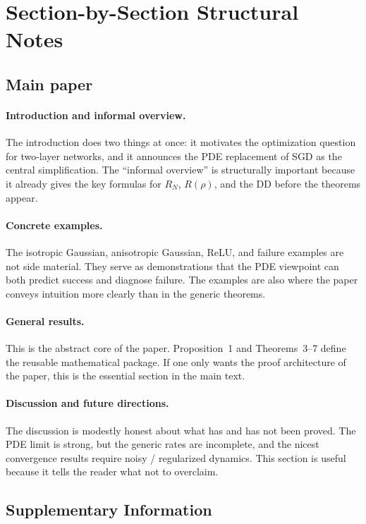 \section{Section-by-Section Structural Notes}

\subsection*{Main paper}

\paragraph{Introduction and informal overview.}
The introduction does two things at once: it motivates the optimization question for two-layer networks, and it announces the PDE replacement of SGD as the central simplification. The ``informal overview'' is structurally important because it already gives the key formulas for $R_N$, $R(\rho)$, and the DD before the theorems appear.

\paragraph{Concrete examples.}
The isotropic Gaussian, anisotropic Gaussian, ReLU, and failure examples are not side material. They serve as demonstrations that the PDE viewpoint can both predict success and diagnose failure. The examples are also where the paper conveys intuition more clearly than in the generic theorems.

\paragraph{General results.}
This is the abstract core of the paper. Proposition~1 and Theorems~3--7 define the reusable mathematical package. If one only wants the proof architecture of the paper, this is the essential section in the main text.

\paragraph{Discussion and future directions.}
The discussion is modestly honest about what has and has not been proved. The PDE limit is strong, but the generic rates are incomplete, and the nicest convergence results require noisy / regularized dynamics. This section is useful because it tells the reader what not to overclaim.

\subsection*{Supplementary Information}

